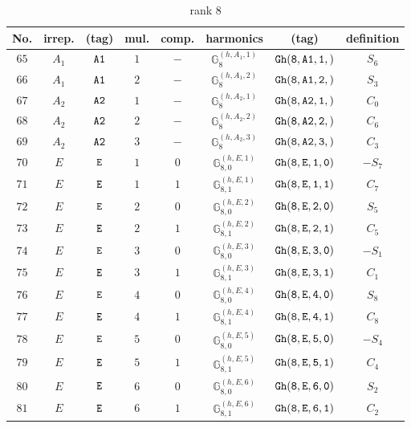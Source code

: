 \documentclass[fleqn,8pt]{jsarticle}
\begin{document}
\begin{table}[ht!]
\begin{center}
\caption{rank 8}
\renewcommand{\arraystretch}{1.3}
\begin{tabular}{cccccccc} \hline \hline
No. & irrep. & (tag) & mul. & comp. & harmonics & (tag) & definition \\ \hline
$ 65 $ & $ A_{1} $ & $ {\tt A1} $ & $ 1 $ & $ - $ & $ \mathbb{G}_{8}^{(h,A_{1},1)} $ & $ {\tt Gh(8,A1,1,)} $ & $ S_{6} $ \\
$ 66 $ & $ A_{1} $ & $ {\tt A1} $ & $ 2 $ & $ - $ & $ \mathbb{G}_{8}^{(h,A_{1},2)} $ & $ {\tt Gh(8,A1,2,)} $ & $ S_{3} $ \\
$ 67 $ & $ A_{2} $ & $ {\tt A2} $ & $ 1 $ & $ - $ & $ \mathbb{G}_{8}^{(h,A_{2},1)} $ & $ {\tt Gh(8,A2,1,)} $ & $ C_{0} $ \\
$ 68 $ & $ A_{2} $ & $ {\tt A2} $ & $ 2 $ & $ - $ & $ \mathbb{G}_{8}^{(h,A_{2},2)} $ & $ {\tt Gh(8,A2,2,)} $ & $ C_{6} $ \\
$ 69 $ & $ A_{2} $ & $ {\tt A2} $ & $ 3 $ & $ - $ & $ \mathbb{G}_{8}^{(h,A_{2},3)} $ & $ {\tt Gh(8,A2,3,)} $ & $ C_{3} $ \\
$ 70 $ & $ E $ & $ {\tt E} $ & $ 1 $ & $ 0 $ & $ \mathbb{G}_{8,0}^{(h,E,1)} $ & $ {\tt Gh(8,E,1,0)} $ & $ - S_{7} $ \\
$ 71 $ & $ E $ & $ {\tt E} $ & $ 1 $ & $ 1 $ & $ \mathbb{G}_{8,1}^{(h,E,1)} $ & $ {\tt Gh(8,E,1,1)} $ & $ C_{7} $ \\
$ 72 $ & $ E $ & $ {\tt E} $ & $ 2 $ & $ 0 $ & $ \mathbb{G}_{8,0}^{(h,E,2)} $ & $ {\tt Gh(8,E,2,0)} $ & $ S_{5} $ \\
$ 73 $ & $ E $ & $ {\tt E} $ & $ 2 $ & $ 1 $ & $ \mathbb{G}_{8,1}^{(h,E,2)} $ & $ {\tt Gh(8,E,2,1)} $ & $ C_{5} $ \\
$ 74 $ & $ E $ & $ {\tt E} $ & $ 3 $ & $ 0 $ & $ \mathbb{G}_{8,0}^{(h,E,3)} $ & $ {\tt Gh(8,E,3,0)} $ & $ - S_{1} $ \\
$ 75 $ & $ E $ & $ {\tt E} $ & $ 3 $ & $ 1 $ & $ \mathbb{G}_{8,1}^{(h,E,3)} $ & $ {\tt Gh(8,E,3,1)} $ & $ C_{1} $ \\
$ 76 $ & $ E $ & $ {\tt E} $ & $ 4 $ & $ 0 $ & $ \mathbb{G}_{8,0}^{(h,E,4)} $ & $ {\tt Gh(8,E,4,0)} $ & $ S_{8} $ \\
$ 77 $ & $ E $ & $ {\tt E} $ & $ 4 $ & $ 1 $ & $ \mathbb{G}_{8,1}^{(h,E,4)} $ & $ {\tt Gh(8,E,4,1)} $ & $ C_{8} $ \\
$ 78 $ & $ E $ & $ {\tt E} $ & $ 5 $ & $ 0 $ & $ \mathbb{G}_{8,0}^{(h,E,5)} $ & $ {\tt Gh(8,E,5,0)} $ & $ - S_{4} $ \\
$ 79 $ & $ E $ & $ {\tt E} $ & $ 5 $ & $ 1 $ & $ \mathbb{G}_{8,1}^{(h,E,5)} $ & $ {\tt Gh(8,E,5,1)} $ & $ C_{4} $ \\
$ 80 $ & $ E $ & $ {\tt E} $ & $ 6 $ & $ 0 $ & $ \mathbb{G}_{8,0}^{(h,E,6)} $ & $ {\tt Gh(8,E,6,0)} $ & $ S_{2} $ \\
$ 81 $ & $ E $ & $ {\tt E} $ & $ 6 $ & $ 1 $ & $ \mathbb{G}_{8,1}^{(h,E,6)} $ & $ {\tt Gh(8,E,6,1)} $ & $ C_{2} $ \\
 \hline \hline
\end{tabular}
\end{center}
\end{table}
\end{document}
